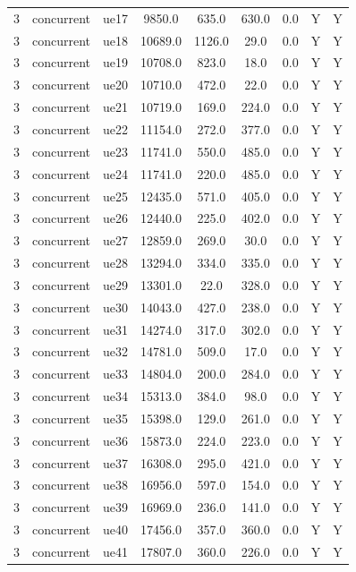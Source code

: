 \begin{table}[ht]
\begin{tabular}{|c|c|c|c|c|c|c|c|c|}
3 & concurrent & ue17 & 9850.0 & 635.0 & 630.0 & 0.0 & Y & Y \\
3 & concurrent & ue18 & 10689.0 & 1126.0 & 29.0 & 0.0 & Y & Y \\
3 & concurrent & ue19 & 10708.0 & 823.0 & 18.0 & 0.0 & Y & Y \\
3 & concurrent & ue20 & 10710.0 & 472.0 & 22.0 & 0.0 & Y & Y \\
3 & concurrent & ue21 & 10719.0 & 169.0 & 224.0 & 0.0 & Y & Y \\
3 & concurrent & ue22 & 11154.0 & 272.0 & 377.0 & 0.0 & Y & Y \\
3 & concurrent & ue23 & 11741.0 & 550.0 & 485.0 & 0.0 & Y & Y \\
3 & concurrent & ue24 & 11741.0 & 220.0 & 485.0 & 0.0 & Y & Y \\
3 & concurrent & ue25 & 12435.0 & 571.0 & 405.0 & 0.0 & Y & Y \\
3 & concurrent & ue26 & 12440.0 & 225.0 & 402.0 & 0.0 & Y & Y \\
3 & concurrent & ue27 & 12859.0 & 269.0 & 30.0 & 0.0 & Y & Y \\
3 & concurrent & ue28 & 13294.0 & 334.0 & 335.0 & 0.0 & Y & Y \\
3 & concurrent & ue29 & 13301.0 & 22.0 & 328.0 & 0.0 & Y & Y \\
3 & concurrent & ue30 & 14043.0 & 427.0 & 238.0 & 0.0 & Y & Y \\
3 & concurrent & ue31 & 14274.0 & 317.0 & 302.0 & 0.0 & Y & Y \\
3 & concurrent & ue32 & 14781.0 & 509.0 & 17.0 & 0.0 & Y & Y \\
3 & concurrent & ue33 & 14804.0 & 200.0 & 284.0 & 0.0 & Y & Y \\
3 & concurrent & ue34 & 15313.0 & 384.0 & 98.0 & 0.0 & Y & Y \\
3 & concurrent & ue35 & 15398.0 & 129.0 & 261.0 & 0.0 & Y & Y \\
3 & concurrent & ue36 & 15873.0 & 224.0 & 223.0 & 0.0 & Y & Y \\
3 & concurrent & ue37 & 16308.0 & 295.0 & 421.0 & 0.0 & Y & Y \\
3 & concurrent & ue38 & 16956.0 & 597.0 & 154.0 & 0.0 & Y & Y \\
3 & concurrent & ue39 & 16969.0 & 236.0 & 141.0 & 0.0 & Y & Y \\
3 & concurrent & ue40 & 17456.0 & 357.0 & 360.0 & 0.0 & Y & Y \\
3 & concurrent & ue41 & 17807.0 & 360.0 & 226.0 & 0.0 & Y & Y \\

\end{tabular}
\end{table}
